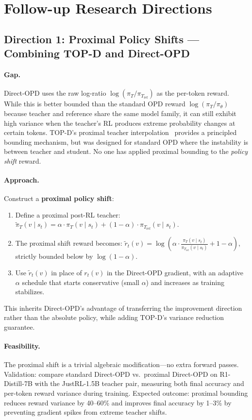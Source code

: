 \documentclass[11pt,a4paper]{article}
\begin{document}
\section{Follow-up Research Directions}

\subsection{Direction 1: Proximal Policy Shifts --- Combining TOP-D and Direct-OPD}

\paragraph{Gap.} Direct-OPD uses the raw log-ratio $\log(\pi_T / \pi_{T_\mathrm{ref}})$ as the per-token reward. While this is better bounded than the standard OPD reward $\log(\pi_T / \pi_\theta)$ because teacher and reference share the same model family, it can still exhibit high variance when the teacher's RL produces extreme probability changes at certain tokens. TOP-D's proximal teacher interpolation~\cite{topd2026} provides a principled bounding mechanism, but was designed for standard OPD where the instability is between teacher and student. No one has applied proximal bounding to the \emph{policy shift} reward.

\paragraph{Approach.} Construct a \textbf{proximal policy shift}:
\begin{enumerate}
\item Define a proximal post-RL teacher: $\tilde{\pi}_T(v \mid s_t) = \alpha \cdot \pi_T(v \mid s_t) + (1-\alpha) \cdot \pi_{T_\mathrm{ref}}(v \mid s_t)$.
\item The proximal shift reward becomes: $\tilde{r}_t(v) = \log\!\left(\alpha \cdot \frac{\pi_T(v \mid s_t)}{\pi_{T_\mathrm{ref}}(v \mid s_t)} + 1 - \alpha\right)$, strictly bounded below by $\log(1-\alpha)$.
\item Use $\tilde{r}_t(v)$ in place of $r_t(v)$ in the Direct-OPD gradient, with an adaptive $\alpha$ schedule that starts conservative (small $\alpha$) and increases as training stabilizes.
\end{enumerate}
This inherits Direct-OPD's advantage of transferring the improvement direction rather than the absolute policy, while adding TOP-D's variance reduction guarantee.

\paragraph{Feasibility.} The proximal shift is a trivial algebraic modification---no extra forward passes. Validation: compare standard Direct-OPD vs.\ proximal Direct-OPD on R1-Distill-7B with the JustRL-1.5B teacher pair, measuring both final accuracy and per-token reward variance during training. Expected outcome: proximal bounding reduces reward variance by 40--60\% and improves final accuracy by 1--3\% by preventing gradient spikes from extreme teacher shifts.
\end{document}
